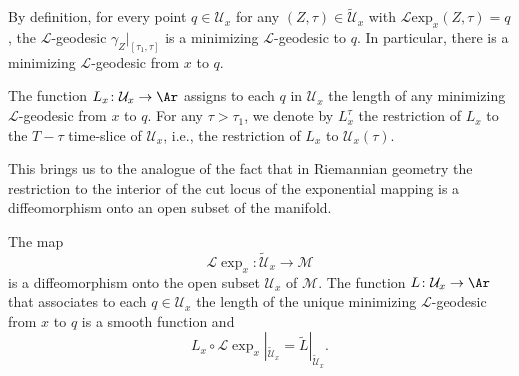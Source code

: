 By definition, for every point $q\in {\mathcal U}_x$ for any
$(Z,\tau)\in \widetilde{\mathcal U}_x$ with ${\mathcal L}\mathrm{exp}_x(Z,\tau)=q$, the ${\mathcal L}$-geodesic
$\gamma_{Z}|_{[\tau_1,\tau]}$  is a minimizing
 ${\mathcal L}$-geodesic to $q$. In particular, there is a minimizing
 ${\mathcal L}$-geodesic from $x$ to $q$.

\begin{definition}\label{def:minimal-l-length-function}
The function $L_x\colon {\mathcal U}_x\to \Ar$
assigns to each $q$ in ${\mathcal U}_x$ the length of any minimizing
${\mathcal L}$-geodesic from $x$ to $q$. For any $\tau>\tau_1$, we
denote by $L_x^\tau$ the restriction of $L_x$
to the $T-\tau$ time-slice of ${\mathcal U}_x$, i.e., the
restriction of $L_x$ to ${\mathcal U}_x(\tau)$.
\end{definition}

 This brings us to the
analogue of the fact that in Riemannian geometry the restriction to
the interior of the cut locus of the exponential mapping is a
diffeomorphism onto an open subset of the manifold.


\begin{proposition}\label{prop:l-exponential-diffeomorphism}
\label{diffeo}
The map
$${\mathcal L}\exp_x\colon\widetilde {\mathcal
U}_x\to {\mathcal M}$$ is a diffeomorphism onto the open subset
${\mathcal U}_x$ of ${\mathcal M}$. The function $L\colon {\mathcal
U}_x\to \Ar$ that associates to each $q\in {\mathcal U}_x$ the
length of the unique minimizing ${\mathcal L}$-geodesic from $x$ to
$q$ is a smooth function and
$$L_x\circ {\mathcal L}\exp_x|_{\widetilde{\mathcal U}_x}
=\widetilde L|_{\widetilde{\mathcal U}_x}.$$
\end{proposition}



